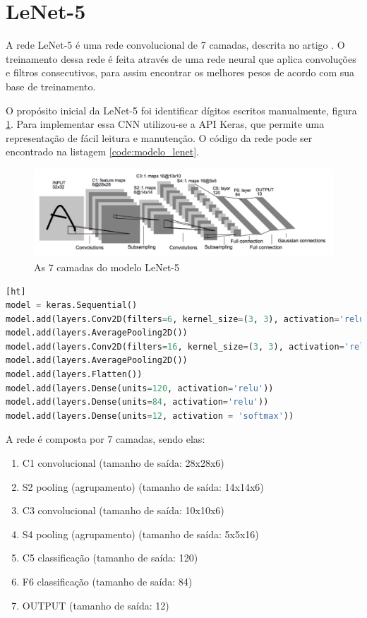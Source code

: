 \documentclass[12pt,
	english,			%
	french,				%
	spanish,			%
	brazil,				%
	]{article}
\begin{document}
\section{LeNet-5}

A rede LeNet-5 é uma rede convolucional de 7 camadas, descrita no artigo \cite{Lecun98gradient-basedlearning}. O treinamento dessa rede é feita através de uma rede neural que aplica convoluções e filtros consecutivos, para assim encontrar os melhores pesos de acordo com sua base de treinamento.

O propósito inicial da LeNet-5 foi identificar dígitos escritos manualmente, figura \ref{fig:image_lenet5}. Para implementar essa CNN utilizou-se a API Keras, que permite uma representação de fácil leitura e manutenção. O código da rede pode ser encontrado na listagem \ref{code:modelo_lenet}.

\newpage

\begin{figure}[!ht]
  \centering
  \includegraphics[width=35em]{images/lenet5.pdf}
  \caption{As 7 camadas do modelo LeNet-5\cite{Lecun98gradient-basedlearning}}
  \label{fig:image_lenet5}
\end{figure}

\begin{lstlisting}[caption={LeNet-5 implementado em Keras},captionpos=b,frame=single,label={code:modelo_lenet}, language=Python][ht]
model = keras.Sequential()
model.add(layers.Conv2D(filters=6, kernel_size=(3, 3), activation='relu', input_shape=(32,32,1)))
model.add(layers.AveragePooling2D())
model.add(layers.Conv2D(filters=16, kernel_size=(3, 3), activation='relu'))
model.add(layers.AveragePooling2D())
model.add(layers.Flatten())
model.add(layers.Dense(units=120, activation='relu'))
model.add(layers.Dense(units=84, activation='relu'))
model.add(layers.Dense(units=12, activation = 'softmax'))
\end{lstlisting}

A rede é composta por 7 camadas, sendo elas:
\begin{enumerate}
  \item C1 convolucional (tamanho de saída: 28x28x6)
  \item S2 pooling (agrupamento) (tamanho de saída: 14x14x6)
  \item C3 convolucional (tamanho de saída: 10x10x6)
  \item S4 pooling (agrupamento) (tamanho de saída: 5x5x16)
  \item C5 classificação (tamanho de saída: 120)
  \item F6 classificação (tamanho de saída: 84)
  \item OUTPUT (tamanho de saída: 12)
\end{enumerate}
\end{document}
